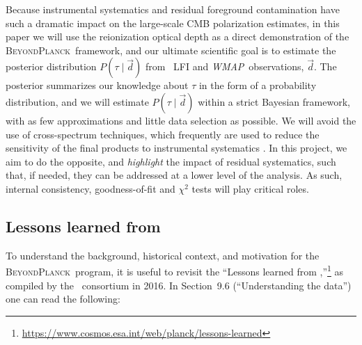 \documentclass[onecolumn]{aa}
\def\WMAP{\emph{WMAP}}
\renewcommand{\d}[0]{\vec{d}}
\newcommand{\BP}{\textsc{BeyondPlanck}}
\begin{document}
Because instrumental systematics and residual foreground contamination
have such a dramatic impact on the large-scale CMB polarization
estimates, in this paper we will use the reionization optical depth as
a direct demonstration of the \BP\ framework, and our ultimate
scientific goal is to estimate the posterior distribution $P(\tau\mid
\d)$ from \Planck\ LFI and \WMAP\ observations, $\d$. The posterior
summarizes our knowledge about $\tau$ in the form of a probability
distribution, and we will estimate $P(\tau\mid \d)$ within a strict
Bayesian framework, with as few approximations and little data
selection as possible. We will avoid the use of cross-spectrum
techniques, which frequently are used to reduce the sensitivity of the
final products to instrumental systematics
\citep[e.g.,][]{planck2016-l05}. In this project, we aim to do the
opposite, and \emph{highlight} the impact of residual systematics,
such that, if needed, they can be addressed at a lower level of the
analysis. As such, internal consistency, goodness-of-fit and $\chi^2$
tests will play critical roles.

\subsection{Lessons learned from \Planck}
\label{sec:lessons}

To understand the background, historical context, and motivation for
the \BP\ program, it is useful to revisit the ``Lessons learned from
\Planck,''\footnote{\href{URL}{https://www.cosmos.esa.int/web/planck/lessons-learned}}
as compiled by the \Planck\ consortium in 2016. In Section~9.6
(``Understanding the data'') one can read the following:
\end{document}
